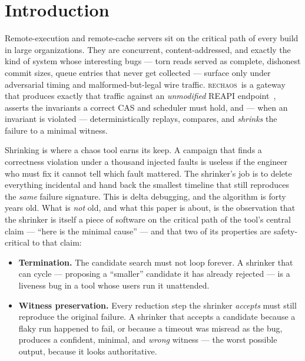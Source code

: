 \documentclass[10pt,twocolumn,letterpaper]{article}
\newcommand{\rc}{\textsc{rechaos}}
\begin{document}
\section{Introduction}\label{sec:introduction}
Remote-execution and remote-cache servers sit on the critical path of every
build in large organizations. They are concurrent, content-addressed, and
exactly the kind of system whose interesting bugs --- torn reads served as
complete, dishonest commit sizes, queue entries that never get collected ---
surface only under adversarial timing and malformed-but-legal wire traffic.
\rc\ is a gateway that produces exactly that traffic against an \emph{unmodified}
REAPI endpoint~\cite{reapi}, asserts the invariants a correct CAS and scheduler
must hold, and --- when an invariant is violated --- deterministically replays,
compares, and \emph{shrinks} the failure to a minimal witness.

Shrinking is where a chaos tool earns its keep. A campaign that finds a
correctness violation under a thousand injected faults is useless if the
engineer who must fix it cannot tell which fault mattered. The shrinker's job is
to delete everything incidental and hand back the smallest timeline that still
reproduces the \emph{same} failure signature. This is delta debugging, and the
algorithm is forty years old. What is \emph{not} old, and what this paper is
about, is the observation that the shrinker is itself a piece of software on the
critical path of the tool's central claim --- ``here is the minimal cause'' ---
and that two of its properties are safety-critical to that claim:

\begin{itemize}[leftmargin=1.2em,itemsep=1pt,topsep=2pt]
\item \textbf{Termination.} The candidate search must not loop forever. A
shrinker that can cycle --- proposing a ``smaller'' candidate it has already
rejected --- is a liveness bug in a tool whose users run it unattended.
\item \textbf{Witness preservation.} Every reduction step the shrinker
\emph{accepts} must still reproduce the original failure. A shrinker that
accepts a candidate because a flaky run happened to fail, or because a timeout
was misread as the bug, produces a confident, minimal, and \emph{wrong} witness
--- the worst possible output, because it looks authoritative.
\end{itemize}
\end{document}
